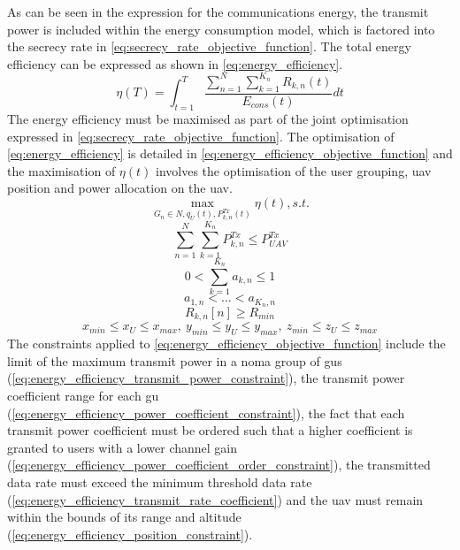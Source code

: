 As can be seen in the expression for the communications energy, the transmit power is included within the energy consumption model, which is factored into the secrecy rate in \ref{eq:secrecy_rate_objective_function}.
The total energy efficiency can be expressed as shown in \ref{eq:energy_efficiency}. 
\begin{equation} \label{eq:energy_efficiency}
    \eta (T) = \int_{t=1}^{T} \frac{\sum_{n=1}^{N} \sum_{k=1}^{K_{n}} R_{k, n}(t)}{E_{cons}(t)} dt
\end{equation}
The energy efficiency must be maximised as part of the joint optimisation expressed in \ref{eq:secrecy_rate_objective_function}. The optimisation of \ref{eq:energy_efficiency} is detailed in \ref{eq:energy_efficiency_objective_function} and the maximisation of $\eta(t)$ involves the optimisation of the user grouping, \acrshort{uav} position and power allocation on the \acrshort{uav}. 
\begin{equation} \label{eq:energy_efficiency_objective_function}
    \underset{G_{n} \in N, q_{U}(t), P_{k, n}^{Tx}(t)}{\max} \eta (t), s.t.
\end{equation}
\begin{equation} \label{eq:energy_efficiency_transmit_power_constraint}
    \sum_{n=1}^{N} \sum_{k=1}^{K_n} P_{k, n}^{Tx} \le P_{UAV}^{Tx} 
\end{equation}
\begin{equation} \label{eq:energy_efficiency_power_coefficient_constraint}
    0 < \sum_{k=1}^{K_n} a_{k, n} \le 1
\end{equation}
\begin{equation} \label{eq:energy_efficiency_power_coefficient_order_constraint}
    a_{1, n} < \dots < a_{K_n, n}
\end{equation}
\begin{equation} \label{eq:energy_efficiency_transmit_rate_coefficient}
    R_{k, n} [n] \ge R_{min}
\end{equation}
\begin{equation} \label{eq:energy_efficiency_position_constraint}
    x_{min} \le x_{U} \le x_{max},\ y_{min} \le y_{U} \le y_{max},\ z_{min} \le z_{U} \le z_{max}
\end{equation}
The constraints applied to \ref{eq:energy_efficiency_objective_function} include the limit of the maximum transmit power in a \acrshort{noma} group of \acrshort{gu}s (\ref{eq:energy_efficiency_transmit_power_constraint}), the transmit power coefficient range for each \acrshort{gu} (\ref{eq:energy_efficiency_power_coefficient_constraint}), the fact that each transmit power coefficient must be ordered such that a higher coefficient is granted to users with a lower channel gain (\ref{eq:energy_efficiency_power_coefficient_order_constraint}), the transmitted data rate must exceed the minimum threshold data rate (\ref{eq:energy_efficiency_transmit_rate_coefficient}) and the \acrshort{uav} must remain within the bounds of its range and altitude (\ref{eq:energy_efficiency_position_constraint}). 

